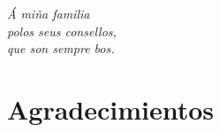 \documentclass[12pt]{report} %
\begin{document}
	

\clearpage  %
\thispagestyle{empty}
\mbox{}

\clearpage  %
\begin{flushright}
    \textit{Á miña familia\\ polos seus consellos,\\ que son sempre bos.}
\end{flushright}
\clearpage
\thispagestyle{empty}
\mbox{}

\clearpage  %
\renewcommand\abstractname{\large\bfseries\filcenter\uppercase{Resumen}}


\newpage %
\thispagestyle{empty}
\mbox{}


\chapter*{Agradecimientos} %

\setcounter{page}{5}
	
	
		
	\vfill
	
	\newpage %
	\thispagestyle{empty}
	\mbox{}
	

\tableofcontents
\thispagestyle{fancy}


\listoffigures
\thispagestyle{fancy}


\listoftables
\thispagestyle{fancy}
\end{document}
